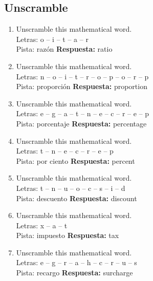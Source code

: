 \documentclass[11pt,a4paper]{article}
\begin{document}
\subsection{Unscramble}
\begin{enumerate}
\item Unscramble this mathematical word.\\Letras: o -- i -- t -- a -- r\\Pista: razón
\textbf{Respuesta:} ratio
\item Unscramble this mathematical word.\\Letras: n -- o -- i -- t -- r -- o -- p -- o -- r -- p\\Pista: proporción
\textbf{Respuesta:} proportion
\item Unscramble this mathematical word.\\Letras: e -- g -- a -- t -- n -- e -- c -- r -- e -- p\\Pista: porcentaje
\textbf{Respuesta:} percentage
\item Unscramble this mathematical word.\\Letras: t -- n -- e -- c -- r -- e -- p\\Pista: por ciento
\textbf{Respuesta:} percent
\item Unscramble this mathematical word.\\Letras: t -- n -- u -- o -- c -- s -- i -- d\\Pista: descuento
\textbf{Respuesta:} discount
\item Unscramble this mathematical word.\\Letras: x -- a -- t\\Pista: impuesto
\textbf{Respuesta:} tax
\item Unscramble this mathematical word.\\Letras: e -- g -- r -- a -- h -- c -- r -- u -- s\\Pista: recargo
\textbf{Respuesta:} surcharge
\end{enumerate}
\end{document}
